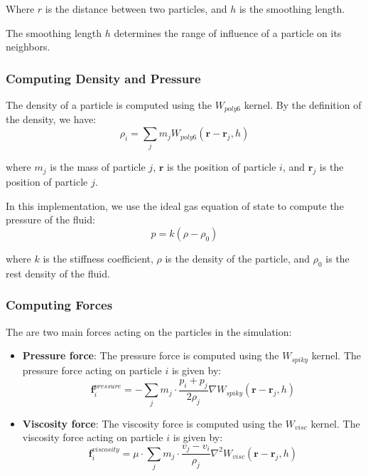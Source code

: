\documentclass[a4paper]{article}
\begin{document}
Where $r$ is the distance between two particles, and $h$ is the smoothing length.

The smoothing length $h$ determines the range of influence of a particle on its neighbors.

\subsubsection{Computing Density and Pressure}

The density of a particle is computed using the $W_{poly6}$ kernel. By the definition of the density, we have:
\[
  \rho_i = \sum_{j}m_j W_{poly6}(\mathbf{r} - \mathbf{r}_j, h)
\]

where $m_j$ is the mass of particle $j$, $\mathbf{r}$ is the position of particle $i$, and $\mathbf{r}_j$ is the position of particle $j$.

In this implementation, we use the ideal gas equation of state to compute the pressure of the fluid:
\[
  p = k(\rho - \rho_0)
\]

where $k$ is the stiffness coefficient, $\rho$ is the density of the particle, and $\rho_0$ is the rest density of the fluid.

\subsubsection{Computing Forces}

The are two main forces acting on the particles in the simulation:
\begin{itemize}
  \item \textbf{Pressure force}:
    The pressure force is computed using the $W_{spiky}$ kernel. The pressure force acting on particle $i$ is given by:
    \begin{equation}
    \nonumber
      \mathbf{f}^{pressure}_i = -\sum_{j} m_j \cdot \frac{p_i + p_j}{2 \rho_j} \nabla W_{spiky}(\mathbf{r} - \mathbf{r}_j, h)
    \end{equation}
  \item \textbf{Viscosity force}:
    The viscosity force is computed using the $W_{visc}$ kernel. The viscosity force acting on particle $i$ is given by:
    \begin{equation}
    \nonumber
      \mathbf{f}^{viscosity}_i = \mu \cdot \sum_{j} m_j \cdot \frac{v_j - v_i}{\rho_j} \nabla^2 W_{visc}(\mathbf{r} - \mathbf{r}_j, h)
    \end{equation}
\end{itemize}
\end{document}
